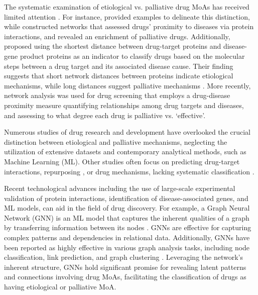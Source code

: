 \documentclass[journal,twoside,web]{ieeecolor}
\begin{document}
The systematic examination of etiological vs. palliative drug MoAs has received limited attention \cite{yildirim2007drug,lindpaintner2002impact,guney2016network}.
For instance, \cite{lindpaintner2002impact} provided examples to delineate this distinction, while \cite{yildirim2007drug} constructed networks that assessed drugs' proximity to diseases via protein interactions, and revealed an enrichment of palliative drugs.
Additionally, \cite{yildirim2007drug} proposed using the shortest distance between drug-target proteins and disease-gene product proteins as an indicator to classify drugs based on the molecular steps between a drug target and its associated disease cause.
Their finding suggests that short network distances between proteins indicate etiological mechanisms, while long distances suggest palliative mechanisms \cite{yildirim2007drug}. 
More recently, network analysis was used for drug screening \cite{guney2016network} that employs a drug-disease proximity measure quantifying relationships among drug targets and diseases, and assessing to what degree each drug is palliative vs. `effective'. 

Numerous studies \cite{thafar2020dtigems+, sachdev2019comprehensive,vogt2014molecularly} of drug research and development have overlooked the crucial distinction between etiological and palliative mechanisms, neglecting the utilization of extensive datasets and contemporary analytical methods, such as Machine Learning (ML).
Other studies often focus on predicting drug-target interactions, repurposing \cite{fahimian2020repcool}, or drug mechanisms, lacking systematic classification \cite{vogt2014molecularly}.

Recent technological advances including the use of large-scale experimental validation of protein interactions, identification of disease-associated genes, and ML models, can aid in the field of drug discovery.
For example, a Graph Neural Network (GNN) is an ML model that captures the inherent qualities of a graph by transferring information between its nodes \cite{zhou2020graph}.
GNNs are effective for capturing complex patterns and dependencies in relational data.
Additionally, GNNs have been reported as highly effective in various graph analysis tasks, including node classification, link prediction, and graph clustering \cite{bongini2021molecular,jiang2021could,zhou2020graph}.
Leveraging the network's inherent structure, GNNs hold significant promise for revealing latent patterns and connections involving drug MoAs, facilitating the classification of drugs as having etiological or palliative MoA.
\end{document}
